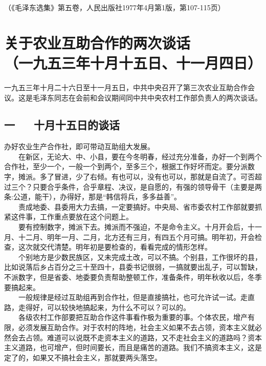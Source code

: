 \documentclass[cn,11pt,chinese]{elegantbook}
\def\myformat#1{\hfil\hfil #1}
\begin{document}
\begin{flushright}（《毛泽东选集》第五卷，人民出版社1977年4月第1版，第107-115页）\end{flushright}
\newpage\section*{\myformat{关于农业互助合作的两次谈话}\\\myformat{（一九五三年十月十五日、十一月四日）}}
\begin{introduction}\item  一九五三年十月二十六日至十一月五日，中共中央召开了第三次农业互助合作会议。这是毛泽东同志在会前和会议期间同中共中央农村工作部负责人的两次谈话。\end{introduction}
\subsection*{\myformat{一 　 十月十五日的谈话}}
办好农业生产合作社，即可带动互助组大发展。\\
　　在新区，无论大、中、小县，要在今冬明春，经过充分准备，办好一个到两个合作社，至少一个，一般一个到两个，至多三个，根据工作好坏而定。要分派数字，摊派。多了冒进，少了右倾。有也可以，没有也可以，那就是自流了。可否超过三个？只要合乎条件，合乎章程、决议，是自愿的，有强的领导骨干（主要是两条:公道，能干），办得好，那是“韩信将兵，多多益善”。\\
　　责成地委、县委用大力去搞，一定要搞好。中央局、省市委农村工作部就要抓紧这件事，工作重点要放在这个问题上。\\
　　要有控制数字，摊派下去。摊派而不强迫，不是命令主义。十月开会后，十一月、十二月、明年一月、二月，北方还有三月，有四五个月可搞。明年初，开会检查，这次就交代清楚。明年初是要检查的，看看完成的情形怎样。\\
　　个别地方是少数民族区，又未完成土改，可以不搞。个别县，工作很坏的县，比如说落后乡占百分之三十至四十，县委书记很弱，一搞就要出乱子，可以暂缺，不派数字，但是省委、地委要负责帮助整顿工作，准备条件，明年秋收以后，冬季要搞起来。\\
　　一般规律是经过互助组再到合作社，但是直接搞社，也可允许试一试。走直路，走得好，可以较快地搞起来，为什么不可以？可以的。\\
　　各级农村工作部要把互助合作这件事看作极为重要的事。个体农民，增产有限，必须发展互助合作。对于农村的阵地，社会主义如果不去占领，资本主义就必然会去占领。难道可以说既不走资本主义的道路，又不走社会主义的道路吗？资本主义道路，也可增产，但时间要长，而且是痛苦的道路。我们不搞资本主义，这是定了的，如果又不搞社会主义，那就要两头落空。\\
\end{document}
